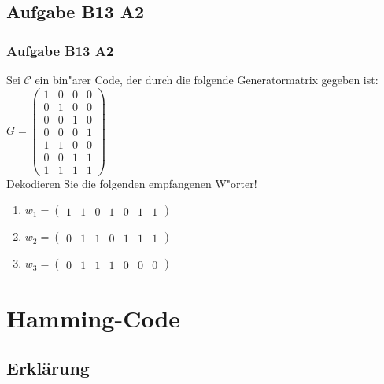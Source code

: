 \subsection{Aufgabe B13 A2}
\begin{frame}
\frametitle{Aufgabe B13 A2}
Sei $\mathcal{C}$ ein bin"arer Code, der durch die folgende Generatormatrix gegeben
ist:\\[4pt]
$G = \left( \begin{array}{cccc}
1 & 0 & 0 & 0 \\
0 & 1 & 0 & 0 \\
0 & 0 & 1 & 0 \\
0 & 0 & 0 & 1 \\
1 & 1 & 0 & 0 \\
0 & 0 & 1 & 1 \\
1 & 1 & 1 & 1
\end{array} \right)$\\[4pt]
Dekodieren Sie die folgenden empfangenen W"orter!
\begin{enumerate}
\item $w_1 = (\begin{array}{ccccccc}1 & 1 & 0 & 1 & 0 & 1 & 1\end{array})$
\item $w_2 = (\begin{array}{ccccccc}0 & 1 & 1 & 0 & 1 & 1 & 1\end{array})$
\item $w_3 = (\begin{array}{ccccccc}0 & 1 & 1 & 1 & 0 & 0 & 0\end{array})$
\end{enumerate}
\end{frame}


\section{Hamming-Code}
\subsection{Erklärung}
